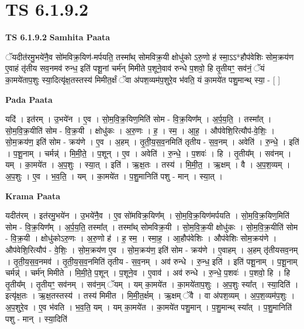 \documentclass[17pt]{extarticle}
\begin{document}
\section{ TS 6.1.9.2 }

\textbf{TS 6.1.9.2 } \newline
\textbf{Samhita Paata} \newline

ॅयदीत॑रमु॒भये॑नै॒व सो॑मविक्र॒यिण॑-मर्पयति॒ तस्मा᳚थ् सोमविक्र॒यी क्षोधु॑को ऽरु॒णो ह॑ स्मा॒ऽऽ*हौप॑वेशिः सोम॒क्रय॑ण ए॒वाहं तृ॑तीय सव॒नमव॑ रुन्ध॒ इति॑ पशू॒नां चर्म॑न् मिमीते प॒शूने॒वाव॑ रुन्धे प॒शवो॒ हि तृ॒तीयꣳ॒॒ सव॑नं॒ ॅयं का॒मये॑ताप॒शुः स्या॒दित्यृ॑क्ष॒तस्तस्य॑ मिमीत॒र्क्षं ॅवा अ॑पश॒व्यम॑प॒शुरे॒व भ॑वति॒ यं का॒मये॑त पशु॒मान्थ् स्या॒ - [  ] \newline

\textbf{Pada Paata} \newline

यदि॑ । इत॑रम् । उ॒भये॑न । ए॒व । सो॒म॒वि॒क्र॒यिण॒मिति॑ सोम - वि॒क्र॒यिण᳚म् । अ॒र्प॒य॒ति॒ । तस्मा᳚त् । सो॒म॒वि॒क्र॒यीति॑ सोम - वि॒क्र॒यी । क्षोधु॑कः । अ॒रु॒णः । ह॒ । स्म॒ । आ॒ह॒ । औप॑वेशि॒रित्यौप॑-वे॒शिः॒ । सो॒म॒क्रय॑ण॒ इति॑ सोम - क्रय॑णे । ए॒व । अ॒हम् । तृ॒ती॒य॒स॒व॒नमिति॑ तृतीय - स॒व॒नम् । अवेति॑ । रु॒न्धे॒ । इति॑ । प॒शू॒नाम् । चर्मन्न्॑ । मि॒मी॒ते॒ । प॒शून् । ए॒व । अवेति॑ । रु॒न्धे॒ । प॒शवः॑ । हि । तृ॒तीय᳚म् । सव॑नम् । यम् । का॒मये॑त । अ॒प॒शुः । स्या॒त् । इति॑ । ऋ॒क्ष॒तः । तस्य॑ । मि॒मी॒त॒ । ऋ॒क्षम् । वै । अ॒प॒श॒व्यम् । अ॒प॒शुः । ए॒व । भ॒व॒ति॒ । यम् । का॒मये॑त । प॒शु॒मानिति॑ पशु - मान् । स्या॒त् ।  \newline


\textbf{Krama Paata} \newline

यदीत॑रम् । इत॑रमु॒भये॑न । उ॒भये॑नै॒व । ए॒व सो॑मविक्र॒यिण᳚म् । सो॒म॒वि॒क्र॒यिण॑मर्पयति । सो॒म॒वि॒क्र॒यिण॒मिति॑ सोम - वि॒क्र॒यिण᳚म् । अ॒र्प॒य॒ति॒ तस्मा᳚त् । तस्मा᳚थ् सोमविक्र॒यी । सो॒म॒वि॒क्र॒यी क्षोधु॑कः । सो॒म॒वि॒क्र॒यीति॑ सोम - वि॒क्र॒यी । क्षोधु॑कोऽरु॒णः । अ॒रु॒णो ह॑ । ह॒ स्म॒ । स्मा॒ह॒ । आ॒हौप॑वेशिः । औप॑वेशिः सोम॒क्रय॑णे । औप॑वेशि॒रित्यौप॑ - वे॒शिः॒ । सो॒म॒क्रय॑ण ए॒व । सो॒म॒क्रय॑ण॒ इति॑ सोम - क्रय॑णे । ए॒वाहम् । अ॒हम् तृ॑तीयसव॒नम् । तृ॒ती॒य॒स॒व॒नमव॑ । तृ॒ती॒य॒स॒व॒नमिति॑ तृतीय - स॒व॒नम् । अव॑ रुन्धे । रु॒न्ध॒ इति॑ । इति॑ पशू॒नाम् । प॒शू॒नाम् चर्मन्न्॑ । चर्म॑न् मिमीते । मि॒मी॒ते॒ प॒शून् । प॒शूने॒व । ए॒वाव॑ । अव॑ रुन्धे । रु॒न्धे॒ प॒शवः॑ । प॒शवो॒ हि । हि तृ॒तीय᳚म् । तृ॒तीयꣳ॒॒ सव॑नम् । सव॑न॒म् ॅयम् । यम् का॒मये॑त । का॒मये॑ताप॒शुः । अ॒प॒शुः स्या᳚त् । स्या॒दिति॑ । इत्यृ॑क्ष॒तः । ऋ॒क्ष॒तस्तस्य॑ । तस्य॑ मिमीत । मि॒मी॒त॒र्क्षम् । ऋ॒क्षम् ॅवै । वा अ॑पश॒व्यम् । अ॒प॒श॒व्यम॑प॒शुः । अ॒प॒शुरे॒व । ए॒व भ॑वति । भ॒व॒ति॒ यम् । यम् का॒मये॑त । का॒मये॑त पशु॒मान् । प॒शु॒मान्थ् स्या᳚त् । प॒शु॒मानिति॑ पशु - मान् । स्या॒दिति॑ \newline
\end{document}
